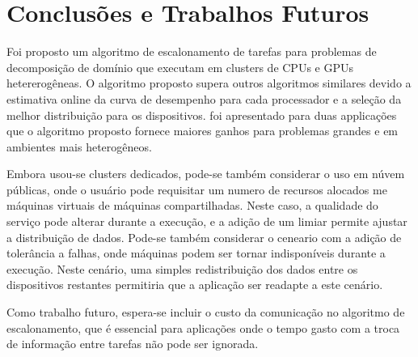 \section{Conclusões e Trabalhos Futuros}\label{cap6:conclusao}

Foi proposto um algoritmo de escalonamento de tarefas para problemas de decomposição de domínio que executam em clusters de CPUs e GPUs hetererogêneas. O algoritmo proposto supera outros algoritmos similares devido a estimativa online da curva de desempenho para cada  processador e a seleção da melhor distribuição para os dispositivos. foi apresentado para duas applicações que o algoritmo proposto fornece maiores ganhos para problemas grandes e em ambientes mais heterogêneos.

Embora usou-se clusters dedicados, pode-se também considerar o uso em núvem públicas, onde o usuário pode requisitar um numero de recursos alocados me máquinas virtuais de máquinas compartilhadas. Neste caso, a qualidade do serviço pode alterar durante a execução, e a adição de um limiar permite ajustar a distribuição de dados. Pode-se também considerar o ceneario com a adição de tolerância a falhas, onde máquinas podem ser tornar indisponíveis durante a execução. Neste cenário, uma simples redistribuição dos dados entre os dispositivos restantes permitiria que a aplicação ser readapte a este cenário.

Como trabalho futuro, espera-se incluir o custo da comunicação no algoritmo de escalonamento, que é essencial para aplicações onde o tempo gasto com a troca de informação entre tarefas não pode ser ignorada.


